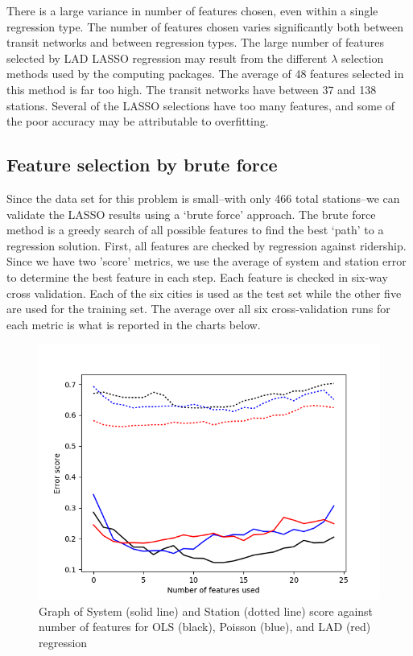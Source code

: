 \documentclass[11pt]{article}
\begin{document}
There is a large variance in number of features chosen, even within a single regression type. The number of features chosen varies significantly both between transit networks and between regression types. The large number of features selected by LAD LASSO regression may result from the different $\lambda$ selection methods used by the computing packages. The average of 48 features selected in this method is far too high. The transit networks have between 37 and 138 stations. Several of the LASSO selections have too many features, and some of the poor accuracy may be attributable to overfitting.



\subsection{Feature selection by brute force}



Since the data set for this problem is small--with only 466 total stations--we can validate the LASSO results using a `brute force' approach. The brute force method is a greedy search of all possible features to find the best `path' to a regression solution. First, all features are checked by regression against ridership. Since we have two 'score' metrics, we use the average of system and station error to determine the best feature in each step. Each feature is checked in six-way cross validation. Each of the six cities is used as the test set while the other five are used for the training set. The average over all six cross-validation runs for each metric is what is reported in the charts below. 


\begin{figure}
\centering
\includegraphics[width=0.8\linewidth]{bfregress}
\vspace{-10pt}
\caption{Graph of System (solid line) and Station (dotted line) score against number of features for OLS (black), Poisson (blue), and LAD (red) regression}\label{fig:bfscores}
\end{figure}
\end{document}
